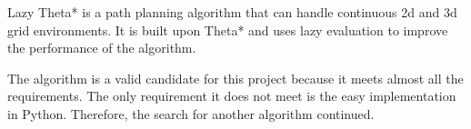 Lazy Theta* is a path planning algorithm that can handle continuous \acs{2d} and \acs{3d} grid environments. It is built upon Theta* and uses lazy evaluation to improve the performance of the algorithm. \cite{lazy_theta_star}

The algorithm is a valid candidate for this project because it meets almost all the requirements. The only requirement it does not meet is the easy implementation in Python. Therefore, the search for another algorithm continued.